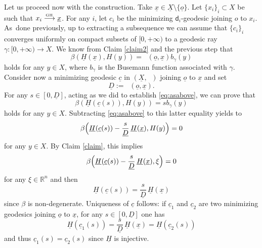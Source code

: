 \documentclass[JEP,XML,SOM,Unicode,published]{cedram}
\def\To#1{\mathchoice{\xrightarrow{\textstyle\kern4pt#1\kern3pt}}{\stackrel{#1}{\longrightarrow}}{}{}}
\newcommand{\sGH}{{\scriptscriptstyle\mathrm{GH}\,}}
\let\backslash\setminus
\theoremstyle{plain}
\theoremstyle{definition}
\newcommand{\setR}{\mathbb{R}}
\newcommand{\dist}{\mathsf{d}}
\newcommand{\uX}{\underline{X}}
\DeclareMathOperator{\udist}{\underline{\dist}}
\newcommand{\uo}{\underline{o}}
\newcommand{\ux}{\underline{x}}
\newcommand{\uc}{\underline{c}}
\newcommand{\uD}{\underline{D}}
\newcommand{\uH}{\underline{H}}
\begin{document}
Let us proceed now with the construction. Take $\ux \in \uX \backslash \{\uo\}$. Let $\{x_i\}_i \subset X$ be such that $x_i \To{\sGH} \ux$. For any $i$, let $c_i$ be the minimizing $\dist_i$-geodesic joining $o$ to $x_i$. As~done previously, up to extracting a subsequence we can assume that $\{c_i\}_i$ converges uniformly on compact subsets of $[0,+\infty)$ to a geodesic ray $\gamma: [0,+\infty) \to X$. We know from Claim \ref{claim2} and the previous step that
\begin{equation}\label{eq:asabove}
\beta(\underline{H}(\ux),H(y)) = \udist(\uo,\ux) b_\gamma(y)
\end{equation}
holds for any $y \in X$, where $b_\gamma$ is the Busemann function associated with $\gamma$. Consider now a minimizing geodesic $\uc$ in $(\uX,\udist)$ joining $\uo$ to $\ux$ and set
\[
\uD:=\udist(\uo,\ux).
\]
For any $s \in [0,\uD]$, acting as we did to establish \eqref{eq:asabove}, we can prove that
\[
\beta(\underline{H}(\uc(s)),H(y)) = s b_\gamma(y)
\]
holds for any $y \in X$. Subtracting \eqref{eq:asabove} to this latter equality yields to
\begin{equation}%
\beta\Bigl(\underline{H}(\uc(s)) - \frac{s}{\uD}\,\uH(\ux), H(y)\Bigr) = 0
\end{equation}
for any $y \in X$. By Claim \ref{claim}, this implies
\begin{equation}%
\beta\Bigl(\underline{H}(\uc(s)) - \frac{s}{\uD}\,\uH(\ux), \xi \Bigr) = 0
\end{equation}
for any $\xi \in \setR^n$ and then
\begin{equation}\label{eq:H}
\underline{H}(\uc(s)) = \frac{s}{\uD}\,\uH(\ux)
\end{equation}
since $\beta$ is non-degenerate. Uniqueness of $\uc$ follows: if $\uc_1$ and $\uc_2$ are two minimizing geodesics joining $\uo$ to $\ux$, for any $s \in [0,\uD]$ one has
\[
\uH(\uc_1(s)) = \frac{s}{\uD}\,\uH(\ux) =\uH(\uc_2(s))
\]
and thus $\uc_1(s)=\uc_2(s)$ since $\uH$ is injective.
\end{document}
